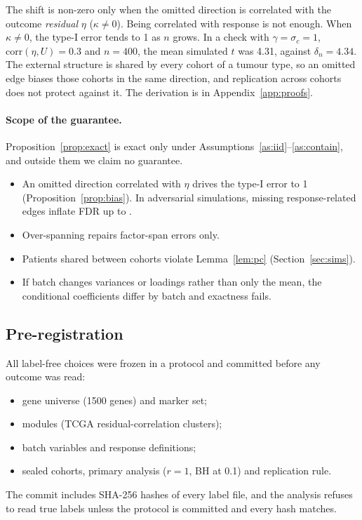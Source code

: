\documentclass[10pt,twocolumn,letterpaper]{article}
\theoremstyle{remark}
\begin{document}
The shift is non-zero only when the omitted direction is correlated with the outcome \emph{residual} $\eta$ ($\kappa\neq0$). Being correlated with response is not enough. When $\kappa\neq0$, the type-I error tends to 1 as $n$ grows. In a check with $\gamma=\sigma_c=1$, $\mathrm{corr}(\eta,U)=0.3$ and $n=400$, the mean simulated $t$ was 4.31, against $\delta_n=4.34$. The external structure is shared by every cohort of a tumour type, so an omitted edge biases those cohorts in the same direction, and replication across cohorts does not protect against it. The derivation is in Appendix~\ref{app:proofs}.

\paragraph{Scope of the guarantee.} Proposition~\ref{prop:exact} is exact only under Assumptions~\ref{as:iid}--\ref{as:contain}, and outside them we claim no guarantee.
\begin{itemize}
  \item An omitted direction correlated with $\eta$ drives the type-I error to 1 (Proposition~\ref{prop:bias}). In adversarial simulations, missing response-related edges inflate FDR up to \advNewDropHi.
  \item Over-spanning repairs factor-span errors only.
  \item Patients shared between cohorts violate Lemma~\ref{lem:pc} (Section~\ref{sec:sims}).
  \item If batch changes variances or loadings rather than only the mean, the conditional coefficients differ by batch and exactness fails.
\end{itemize}

\subsection{Pre-registration}

All label-free choices were frozen in a protocol and committed before any outcome was read:
\begin{itemize}
  \item gene universe (1500 genes) and marker set;
  \item modules (TCGA residual-correlation clusters);
  \item batch variables and response definitions;
  \item sealed cohorts, primary analysis ($r=1$, BH at 0.1) and replication rule.
\end{itemize}
The commit includes SHA-256 hashes of every label file, and the analysis refuses to read true labels unless the protocol is committed and every hash matches.
\end{document}
